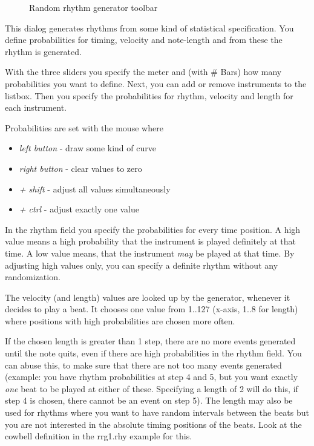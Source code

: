 \documentclass[letterpaper]{report}
\begin{document}
\begin{figure}
\caption{Random rhythm generator toolbar}
\end{figure}

This dialog generates rhythms from some kind of statistical specification.
You define probabilities for timing, velocity and note-length and from these
the rhythm is generated.

With the three sliders you specify the meter and (with \# Bars) how many
probabilities you want to define. Next, you can add or remove instruments
to the listbox. Then you specify the probabilities for rhythm, velocity
and length for each instrument.

Probabilities are set with the mouse where

\begin{itemize}
\item {\em left button} - draw some kind of curve
\item {\em right button} - clear values to zero
\item {\em + shift} - adjust all values simultaneously
\item {\em + ctrl} - adjust exactly one value
\end{itemize}

In the rhythm field you specify the probabilities for every time
position. A high value means a high probability that the instrument is
played definitely at that time. A low value means, that the instrument
{\em may} be played at that time. By adjusting high values only, you
can specify a definite rhythm without any randomization.

The velocity (and length) values are looked up by the generator, whenever
it decides to play a beat.  It chooses one value from 1..127 (x-axis,
1..8 for length) where positions with high probabilities are chosen more
often.

If the chosen length is greater than 1 step, there are no more events
generated until the note quits, even if there are high probabilities in the
rhythm field. You can abuse this, to make sure that there are not too many
events generated (example: you have rhythm probabilities at step 4 and 5,
but you want exactly {\em one} beat to be played at either of these.
Specifying a length of 2 will do this,  if step 4 is chosen, there cannot
be an event on step 5). The length may also be used for rhythms where you
want to have random intervals between the beats but you are not interested
in the absolute timing positions of the beats. Look at the cowbell definition
in the rrg1.rhy example for this.
\end{document}
